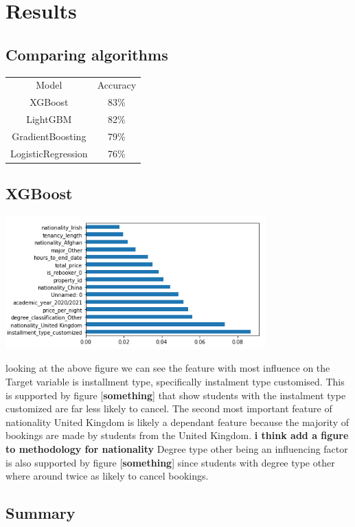 \chapter{Results}
\label{ch:results}
\section{Comparing algorithms}



\begin{center}
\begin{tabular}{ c c}
 Model              & Accuracy \\
XGBoost            & 83\%     \\
LightGBM           & 82\%     \\
GradientBoosting   & 79\%     \\
LogisticRegression & 76\%   
\end{tabular}
\end{center}
\section{XGBoost}

\includegraphics[width=10cm]{figures/results_features.png}

looking at the above figure we can see the feature with most influence on the Target variable is installment type, specifically instalment type customised. This is supported by figure [\textbf{something}] that show students with the instalment type customized are far less likely to cancel. The second most important feature of nationality United Kingdom is likely a dependant feature because the majority of bookings are made by students from the United Kingdom. 
\textbf{i think add a figure to methodology for nationality}
Degree type other being an influencing factor is also supported by figure [\textbf{something}] since students with degree type other where around twice as likely to cancel bookings.




\section{Summary}